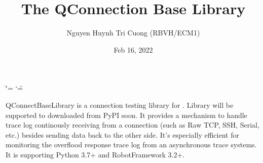 \documentclass[letterpaper,10pt,english]{sphinxmanual}
\title{The QConnection Base Library}
\date{Feb 16, 2022}
\author{Nguyen Huynh Tri Cuong (RBVH/ECM1)}
\begin{document}
\ifdefined\shorthandoff
  \ifnum\catcode`\=\string=\active\shorthandoff{=}\fi
  \ifnum\catcode`\"=\active{}\fi
\fi

\pagestyle{empty}
\sphinxmaketitle
\pagestyle{plain}
\sphinxtableofcontents
\pagestyle{normal}
\label{\detokenize{index::doc}}


\sphinxAtStartPar
QConnectBaseLibrary is a connection testing library for . Library will be supported to
downloaded from PyPI soon. It provides a mechanism to handle trace log
continously receiving from a connection (such as Raw TCP, SSH, Serial,
etc.) besides sending data back to the other side. It’s especially
efficient for monitoring the overflood response trace log from an
asynchronous trace systems. It is supporting Python 3.7+ and
RobotFramework 3.2+.
\end{document}
